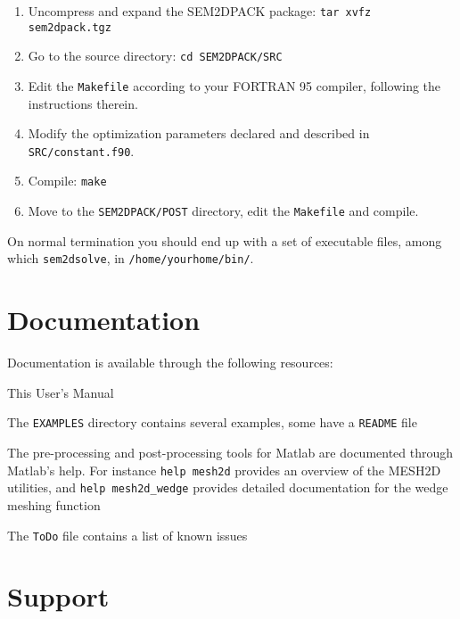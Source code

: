 \begin{enumerate}
\item Uncompress and expand the SEM2DPACK package:
\texttt{tar xvfz sem2dpack.tgz}
\item Go to the source directory: \texttt{cd SEM2DPACK/SRC} 
\item Edit the \texttt{Makefile} according to your FORTRAN 95 compiler,
following the instructions therein.
\item Modify the optimization parameters declared and described in \texttt{SRC/constant.f90}.
\item Compile: \texttt{make}
\item Move to the \texttt{SEM2DPACK/POST} directory, edit the \texttt{Makefile} and compile.
\end{enumerate}
On normal termination you should end up with a set of executable files, among which
\texttt{sem2dsolve}, in \texttt{/home/yourhome/bin/}.

\section{Documentation}
\label{Sec:docs}

Documentation is available through the following resources:
\begin{sitemize}
  \item This User's Manual
  \item The \texttt{EXAMPLES} directory contains several examples, some have a \texttt{README} file
  \item The pre-processing and post-processing tools for Matlab are documented 
through Matlab's help. For instance \texttt{help mesh2d} provides an overview of
the MESH2D utilities, and \texttt{help mesh2d\_wedge} provides detailed documentation
for the wedge meshing function
  \item The \texttt{ToDo} file contains a list of known issues
\end{sitemize}


\section{Support}
\label{Sec:support}


